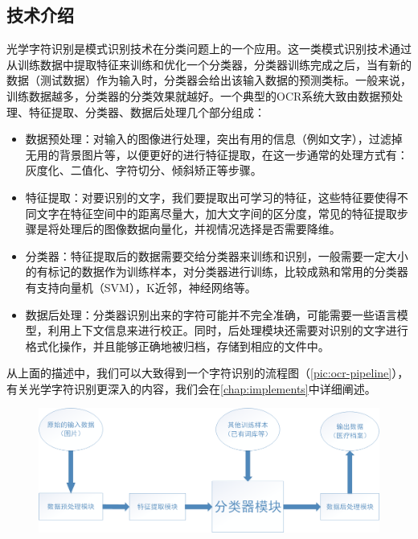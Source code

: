 \subsection{技术介绍}
光学字符识别是模式识别技术在分类问题上的一个应用。这一类模式识别技术通过从训练数据中提取特征来训练和优化一个分类器，分类器训练完成之后，当有新的数据（测试数据）作为输入时，分类器会给出该输入数据的预测类标。一般来说，训练数据越多，分类器的分类效果就越好。一个典型的OCR系统大致由数据预处理、特征提取、分类器、数据后处理几个部分组成：
\begin{itemize}
	\item 数据预处理：对输入的图像进行处理，突出有用的信息（例如文字），过滤掉无用的背景图片等，以便更好的进行特征提取，在这一步通常的处理方式有：灰度化、二值化、字符切分、倾斜矫正等步骤。
	\item 特征提取：对要识别的文字，我们要提取出可学习的特征，这些特征要使得不同文字在特征空间中的距离尽量大，加大文字间的区分度，常见的特征提取步骤是将处理后的图像数据向量化，并视情况选择是否需要降维。
	\item 分类器：特征提取后的数据需要交给分类器来训练和识别，一般需要一定大小的有标记的数据作为训练样本，对分类器进行训练，比较成熟和常用的分类器有支持向量机（SVM），K近邻，神经网络等。
	\item 数据后处理：分类器识别出来的字符可能并不完全准确，可能需要一些语言模型，利用上下文信息来进行校正。同时，后处理模块还需要对识别的文字进行格式化操作，并且能够正确地被归档，存储到相应的文件中。
\end{itemize}
从上面的描述中，我们可以大致得到一个字符识别的流程图（\autoref{pic:ocr-pipeline}），有关光学字符识别更深入的内容，我们会在\autoref{chap:implements}中详细阐述。

\begin{figure}
\centering
  \includegraphics[scale=0.3]{figures/ocr-pipeline}
  \label{pic:ocr-pipeline}
\end{figure}

